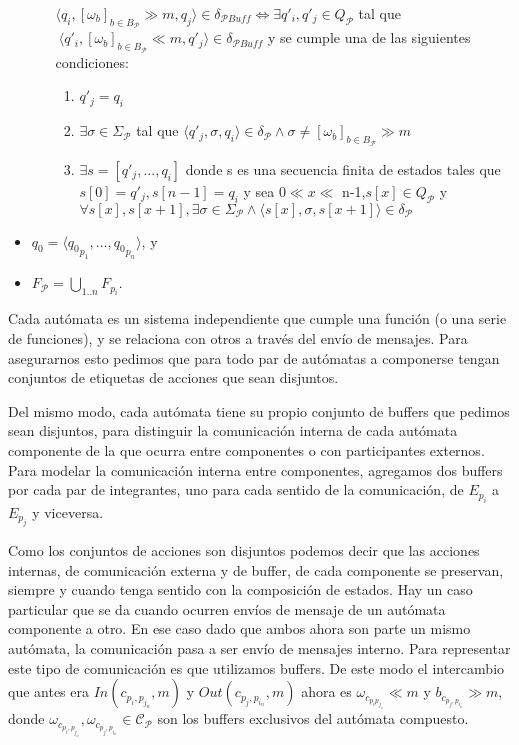 \begin{definition}[Composición]
\begin{itemize}
\begin{enumerate}
$\langle q_i, [\omega_\mathit{b}]_{b \in B_\mathcal{P}} \gg m, q_j \rangle \in \delta_\mathit{\mathcal{P}Buff} \iff \exists q'_i, q'_j \in Q_\mathit{\mathcal{P}}$ tal que $\ \langle q'_i, [\omega_\mathit{b}]_{b \in B_\mathcal{P}} \ll m, q'_j \rangle \in \delta_\mathit{\mathcal{P}Buff}$ y se cumple una de las siguientes condiciones:
\begin{enumerate}
\item $q'_j = q_i$ 
\item $\exists \sigma \in \Sigma_\mathit{\mathcal{P}}$ tal que $\langle q'_j, \sigma, q_i \rangle \in \delta_\mathit{\mathcal{P}} \land \sigma \neq [\omega_\mathit{b}]_{b \in B_\mathcal{P}} \gg m $
\item $\exists s=[q'_j,...,q_i] $ donde s es una secuencia finita de estados tales que $s[0]= q'_j, s[n-1]=q_i$ y sea $ 0 \ll x \ll$ n-1,$s[x] \in Q_\mathit{\mathcal{P}}$ y $\forall s[x], s[x+1], \exists \sigma \in \Sigma_\mathit{\mathcal{P}} \land \langle s[x], \sigma, s[x+1] \rangle \in \delta_\mathit{\mathcal{P}} $  
\end{enumerate} 
\end{enumerate}
\item $q_0 = \langle {q_0}_{p_1}, \ldots, {q_0}_{p_n} \rangle$, y
\item $F_{\mathcal{P}} = \bigcup_{1..n} F_{p_i}$.
\end{itemize}
\end{definition}


Cada autómata es un sistema independiente que cumple una función (o una serie de funciones), y se relaciona con otros a través del envío de mensajes. Para asegurarnos esto pedimos que para todo par de autómatas a componerse tengan conjuntos de etiquetas de acciones que sean disjuntos. 

Del mismo modo, cada autómata tiene su propio conjunto de buffers que pedimos sean disjuntos, para distinguir la comunicación interna de cada autómata componente de la que ocurra entre componentes o con participantes externos. Para modelar la comunicación interna entre componentes, agregamos dos buffers por cada par de integrantes, uno para cada sentido de la comunicación, de $E_{p_i}$ a $E_{p_j}$ y viceversa.

Como los conjuntos de acciones son disjuntos podemos decir que las acciones internas, de comunicación externa y de buffer, de cada componente se preservan, siempre y cuando tenga sentido con la composición de estados. Hay un caso particular que se da cuando ocurren envíos de mensaje de un autómata componente a otro. En ese caso dado que ambos ahora son parte un mismo autómata, la comunicación pasa a ser envío de mensajes interno. Para representar este tipo de comunicación es que utilizamos buffers. De este modo el intercambio que antes era $\mathit{In} (c_{p_i, p_{j_n}},m)$ y $\mathit{Out}(c_{p_j, p_{i_n}},m)$ ahora es $\omega_{c_{p_i p_{j_n}}}  \ll m$ y $b_{c_{p_j, p_{i_n}}}  \gg  m$, donde $ \omega_{c_{p_i, p_{j_n}}}, \omega_{c_{p_j, p_{i_n}}} \in \mathcal{C}_{\mathcal{P}} $ son los buffers exclusivos del autómata compuesto. 

